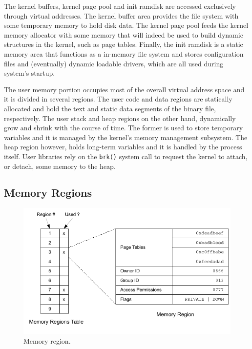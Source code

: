\documentclass[10pt,a4paper]{article}
\begin{document}
The kernel buffers, kernel page pool and init ramdisk are accessed exclusively through virtual addresses. The kernel buffer area provides the file system with some temporary memory to hold disk data. The kernel page pool feeds the kernel memory allocator with some memory that will indeed be used to build dynamic structures in the kernel, such as page tables. Finally, the init ramdisk is a static memory area that functions as a in-memory file system and stores configuration files and (eventually) dynamic loadable drivers, which are all used during system's startup.

The user memory portion occupies most of the overall virtual address space and it is divided in several regions. The user code and data regions are statically allocated and hold the text and static data segments of the binary file, respectively. The user stack and heap regions on the other hand, dynamically grow and shrink with the course of time. The former is used to store temporary variables and it is managed by the kernel's memory management subsystem. The heap region however, holds long-term variables and it is handled by the process itself. User libraries rely on the \texttt{brk()} system call to request the kernel to attach, or detach, some memory to the heap.

\subsection{Memory Regions}

\begin{figure}[!b]
	\centering
	\includegraphics[scale=0.95]{img/memory-regions}
	\caption{Memory region.}
	\label{figure: memory region}
\end{figure}
\end{document}
